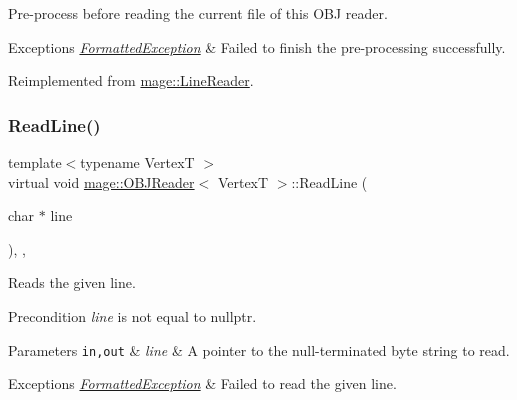 Pre-\/process before reading the current file of this O\+BJ reader.


\begin{DoxyExceptions}{Exceptions}
{\em \hyperlink{classmage_1_1_formatted_exception}{Formatted\+Exception}} & Failed to finish the pre-\/processing successfully. \\
\hline
\end{DoxyExceptions}


Reimplemented from \hyperlink{classmage_1_1_line_reader_a4de135cfb0434be786cfcfd7959031ef}{mage\+::\+Line\+Reader}.

\hypertarget{classmage_1_1_o_b_j_reader_a8d4bd7be6de3098ba899cc36e3be1283}{}\label{classmage_1_1_o_b_j_reader_a8d4bd7be6de3098ba899cc36e3be1283} 
\subsubsection{\texorpdfstring{Read\+Line()}{ReadLine()}}
{\footnotesize\ttfamily template$<$typename VertexT $>$ \\
virtual void \hyperlink{classmage_1_1_o_b_j_reader}{mage\+::\+O\+B\+J\+Reader}$<$ VertexT $>$\+::Read\+Line (\begin{DoxyParamCaption}\item[{char $\ast$}]{line }\end{DoxyParamCaption})\hspace{0.3cm}{\ttfamily [override]}, {\ttfamily [private]}, {\ttfamily [virtual]}}

Reads the given line.

\begin{DoxyPrecond}{Precondition}
{\itshape line} is not equal to {\ttfamily nullptr}. 
\end{DoxyPrecond}

\begin{DoxyParams}[1]{Parameters}
\mbox{\tt in,out}  & {\em line} & A pointer to the null-\/terminated byte string to read. \\
\hline
\end{DoxyParams}

\begin{DoxyExceptions}{Exceptions}
{\em \hyperlink{classmage_1_1_formatted_exception}{Formatted\+Exception}} & Failed to read the given line. \\
\hline
\end{DoxyExceptions}


